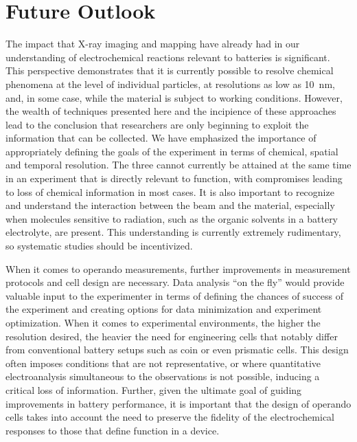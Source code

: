 \documentclass[journal=cmatex,manuscript=perspective]{achemso}
\begin{document}
\section{Future Outlook}

The impact that X-ray imaging and mapping have already had in our
understanding of electrochemical reactions relevant to batteries is
significant. This perspective demonstrates that it is currently
possible to resolve chemical phenomena at the level of individual
particles, at resolutions as low as \SI{10}{nm}, and, in some case,
while the material is subject to working conditions. However, the
wealth of techniques presented here and the incipience of these
approaches lead to the conclusion that researchers are only beginning
to exploit the information that can be collected. We have emphasized
the importance of appropriately defining the goals of the experiment
in terms of chemical, spatial and temporal resolution. The three
cannot currently be attained at the same time in an experiment that is
directly relevant to function, with compromises leading to loss of
chemical information in most cases. It is also important to recognize
and understand the interaction between the beam and the material,
especially when molecules sensitive to radiation, such as the organic
solvents in a battery electrolyte, are present. This understanding is
currently extremely rudimentary, so systematic studies should be
incentivized.

When it comes to operando measurements, further improvements in
measurement protocols and cell design are necessary. Data analysis
``on the fly'' would provide valuable input to the experimenter in
terms of defining the chances of success of the experiment and
creating options for data minimization and experiment
optimization. When it comes to experimental environments, the higher
the resolution desired, the heavier the need for engineering cells
that notably differ from conventional battery setups such as coin or
even prismatic cells. This design often imposes conditions that are
not representative, or where quantitative electroanalysis simultaneous
to the observations is not possible, inducing a critical loss of
information. Further, given the ultimate goal of guiding improvements
in battery performance, it is important that the design of operando
cells takes into account the need to preserve the fidelity of the
electrochemical responses to those that define function in a device.
\end{document}
